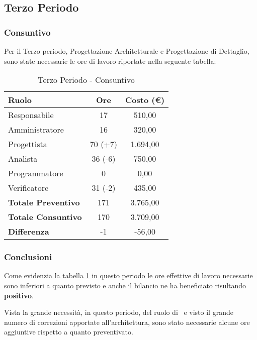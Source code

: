 \documentclass[../PianoDiProgetto_v4.0.0.tex]{subfiles}
\begin{document}
	\subsection{Terzo Periodo}
		\subsubsection{Consuntivo}
		Per il Terzo periodo, Progettazione Architetturale e Progettazione di Dettaglio, sono state necessarie le ore di lavoro riportate nella seguente tabella:
		
		\begin{table}[h]
				\centering
				\begin{tabular}{l * {2}{c}}
					\toprule
					\textbf{Ruolo} & \textbf{Ore} & \textbf{Costo (\euro{})} \\
					\midrule
					Responsabile & 17 & 510,00 \\

					Amministratore & 16 & 320,00 \\

					Progettista & 70 (+7) & 1.694,00 \\

					Analista & 36 (-6) & 750,00 \\		

					Programmatore & 0 & 0,00 \\		

					Verificatore & 31 (-2) & 435,00 \\				
					\midrule		
					\textbf{Totale Preventivo} & 171 & 3.765,00 \\
					\textbf{Totale Consuntivo} & 170 & 3.709,00 \\
					\midrule
					\textbf{Differenza} & -1 & -56,00 \\
					\bottomrule
				\end{tabular}
				\caption{Terzo Periodo - Consuntivo}
				\label{tab:consuntivo3}	
			\end{table}
		
		\subsubsection{Conclusioni}
		Come evidenzia la tabella \ref{tab:consuntivo3} in questo periodo le ore effettive di lavoro necessarie sono inferiori a quanto previsto e anche il bilancio ne ha beneficiato risultando \textbf{positivo}.
		
			Vista la grande necessità, in questo periodo, del ruolo di \progettista\ e visto il grande numero di correzioni apportate all'architettura, sono stato necessarie alcune ore aggiuntive rispetto a quanto preventivato. 
			
\end{document}
